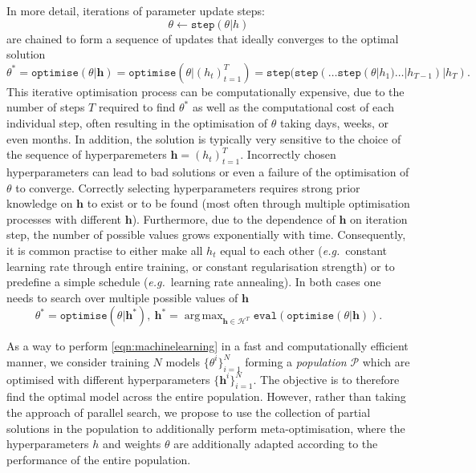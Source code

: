 \documentclass{article} %
\def\eg{\emph{e.g.}}
\DeclareMathOperator*{\argmax}{arg\,max}
\newcommand{\thetam}{\theta}
\newcommand{\thetao}{h}
\begin{document}
In more detail, iterations of parameter update steps:
\begin{equation}
\thetam \leftarrow \mathtt{step}(\thetam | \thetao)
\label{eqn:step}
\end{equation}
are chained to form a sequence of updates that ideally converges to the optimal solution
\begin{equation}
\thetam^* =  \mathtt{optimise}(\thetam | \boldsymbol{\thetao} ) = \mathtt{optimise}(\thetam | (\thetao_t )_{t=1}^T) = \mathtt{step}(\mathtt{step}(\ldots\mathtt{step}(\thetam | \thetao_1)\ldots | \thetao_{T-1})| \thetao_T).
\end{equation}
This iterative optimisation process can be computationally expensive, due to the number of steps $T$ required to find $\thetam^*$ as well as the computational cost of each individual step, often resulting in the optimisation of $\thetam$ taking days, weeks, or even months. In addition, the solution is typically very sensitive to the choice of the sequence of hyperparemeters $\boldsymbol{\thetao} = (\thetao_t )_{t=1}^T$. 
Incorrectly chosen hyperparameters can lead to bad solutions or even a failure of the optimisation of $\thetam$ to converge.
Correctly selecting hyperparameters requires strong prior knowledge on $\boldsymbol{\thetao}$ to exist or to be found (most often through multiple optimisation processes with different $\boldsymbol{\thetao}$).
Furthermore, due to the dependence of $\boldsymbol{\thetao}$ on iteration step, the number of possible values grows exponentially with time. Consequently, it is common practise to either make all $\thetao_t$ equal to each other (\eg~constant learning rate through entire training, or constant regularisation strength) or to predefine a simple schedule (\eg~learning rate annealing). 
In both cases one needs to search over multiple possible values of $\boldsymbol{\thetao}$
\begin{equation}
\thetam^* = \mathtt{optimise}(\thetam | \boldsymbol{\thetao}^*), ~\boldsymbol{\thetao}^* = \argmax_{\boldsymbol{\thetao} \in \mathcal{H}^T} \mathtt{eval}(\mathtt{optimise}(\thetam | \boldsymbol{\thetao})).
\label{eqn:machinelearning}
\end{equation}


As a way to perform \eqref{eqn:machinelearning} in a fast and computationally efficient manner, we consider training $N$ models $\{\thetam^{i}\}_{i=1}^N$ forming a \emph{population} $\mathcal{P}$ which are optimised with different hyperparameters $\{\boldsymbol{\thetao}^{i}\}_{i=1}^N$. The objective is to therefore find the optimal model across the entire population. However, rather than taking the approach of parallel search, we propose to use the collection of partial solutions in the population to additionally perform meta-optimisation, where the hyperparameters $\thetao$ and weights $\thetam$ are additionally adapted according to the performance of the entire population. 
\end{document}
